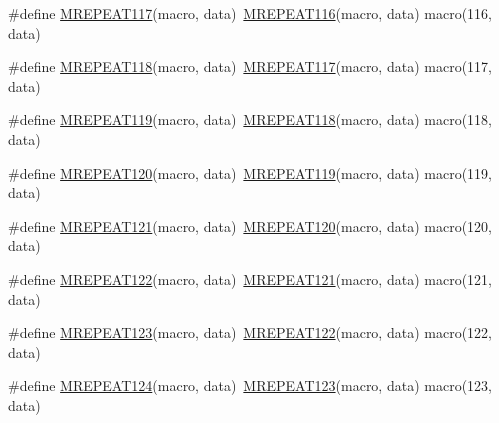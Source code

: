 \begin{DoxyCompactItemize}
\item 
\#define \mbox{\hyperlink{group__group__sam0__utils__mrepeat_gaa23405f68b33c1b3f14c3e45eb3f917a}{M\+R\+E\+P\+E\+A\+T117}}(macro,  data)~\mbox{\hyperlink{group__group__sam0__utils__mrepeat_gad60209ee8f18b1ecf655a810044966aa}{M\+R\+E\+P\+E\+A\+T116}}(macro, data)   macro(116, data)
\item 
\#define \mbox{\hyperlink{group__group__sam0__utils__mrepeat_ga74dc399001884d2f1f942b502ce2b9b6}{M\+R\+E\+P\+E\+A\+T118}}(macro,  data)~\mbox{\hyperlink{group__group__sam0__utils__mrepeat_gaa23405f68b33c1b3f14c3e45eb3f917a}{M\+R\+E\+P\+E\+A\+T117}}(macro, data)   macro(117, data)
\item 
\#define \mbox{\hyperlink{group__group__sam0__utils__mrepeat_ga0aeae0af7aeb117fb68f133cd352ff17}{M\+R\+E\+P\+E\+A\+T119}}(macro,  data)~\mbox{\hyperlink{group__group__sam0__utils__mrepeat_ga74dc399001884d2f1f942b502ce2b9b6}{M\+R\+E\+P\+E\+A\+T118}}(macro, data)   macro(118, data)
\item 
\#define \mbox{\hyperlink{group__group__sam0__utils__mrepeat_ga4a67c3aed21abce662b2668e10a50d4b}{M\+R\+E\+P\+E\+A\+T120}}(macro,  data)~\mbox{\hyperlink{group__group__sam0__utils__mrepeat_ga0aeae0af7aeb117fb68f133cd352ff17}{M\+R\+E\+P\+E\+A\+T119}}(macro, data)   macro(119, data)
\item 
\#define \mbox{\hyperlink{group__group__sam0__utils__mrepeat_ga75b16de882e5c30c0126c306e09d65c1}{M\+R\+E\+P\+E\+A\+T121}}(macro,  data)~\mbox{\hyperlink{group__group__sam0__utils__mrepeat_ga4a67c3aed21abce662b2668e10a50d4b}{M\+R\+E\+P\+E\+A\+T120}}(macro, data)   macro(120, data)
\item 
\#define \mbox{\hyperlink{group__group__sam0__utils__mrepeat_ga002c52a2af11a3a25a748ab09f16a8f5}{M\+R\+E\+P\+E\+A\+T122}}(macro,  data)~\mbox{\hyperlink{group__group__sam0__utils__mrepeat_ga75b16de882e5c30c0126c306e09d65c1}{M\+R\+E\+P\+E\+A\+T121}}(macro, data)   macro(121, data)
\item 
\#define \mbox{\hyperlink{group__group__sam0__utils__mrepeat_gaf0802f3653fa2845f482ec6a119d9260}{M\+R\+E\+P\+E\+A\+T123}}(macro,  data)~\mbox{\hyperlink{group__group__sam0__utils__mrepeat_ga002c52a2af11a3a25a748ab09f16a8f5}{M\+R\+E\+P\+E\+A\+T122}}(macro, data)   macro(122, data)
\item 
\#define \mbox{\hyperlink{group__group__sam0__utils__mrepeat_gaffd8596b4b1da63e7fa64cdeb5c91dd0}{M\+R\+E\+P\+E\+A\+T124}}(macro,  data)~\mbox{\hyperlink{group__group__sam0__utils__mrepeat_gaf0802f3653fa2845f482ec6a119d9260}{M\+R\+E\+P\+E\+A\+T123}}(macro, data)   macro(123, data)

\end{DoxyCompactItemize}
